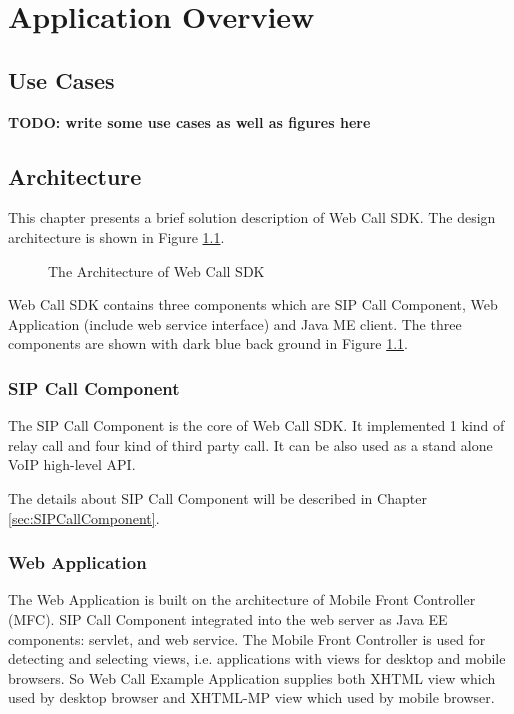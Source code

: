 
\chapter{Application Overview}
\label{sec:WebCallSDKArchitecture}

\section{Use Cases}

\textbf{TODO: write some use cases as well as figures here}


\section{Architecture}
\label{sec:WebCallSDKArchitecture:ArchitectureOverview}

This chapter presents a brief solution description of Web Call SDK. The design architecture is shown in Figure \ref{fig:ArchitectureOfWebCallSDK}.

\begin{figure}[!hbtp]
\centering
{}
\caption{The Architecture of Web Call SDK}
\label{fig:ArchitectureOfWebCallSDK}
\end{figure}

Web Call SDK contains three components which are SIP Call Component, Web Application (include web service interface) and Java ME client. The three components are shown with dark blue back ground in Figure \ref{fig:ArchitectureOfWebCallSDK}.

\subsection{SIP Call Component}

The SIP Call Component is the core of Web Call SDK. It implemented 1 kind of relay call and four kind of third party call. It can be also used as a stand alone VoIP high-level API. 

The details about SIP Call Component will be described in Chapter \ref{sec:SIPCallComponent}.

\subsection{Web Application}

The Web Application is built on the architecture of Mobile Front Controller (MFC). SIP Call Component integrated into the web server as Java EE components: servlet, and web service. The Mobile Front Controller is used for detecting and selecting views, i.e. applications with views for desktop and mobile browsers. So Web Call Example Application supplies both XHTML view which used by desktop browser and XHTML-MP view which used by mobile browser. 

